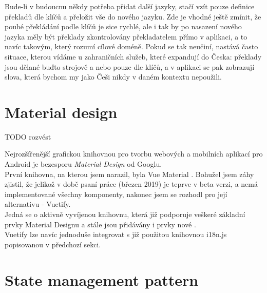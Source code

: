 Bude-li v budoucnu někdy potřeba přidat další jazyky, stačí vzít pouze definice překladů dle klíčů a přeložit vše do nového jazyku. Zde je vhodné ještě zmínit, že pouhé překládání podle klíčů je sice rychlé, ale i tak by po nasazení nového jazyka měly být překlady zkontrolovány překladatelem přímo v aplikaci, a to navíc takovým, který rozumí cílové doméně. Pokud se tak neučiní, nastává často situace, kterou vídáme u zahraničních služeb, které expandují do Česka: překlady jsou dělané buďto strojově a nebo pouze dle klíčů, a v aplikaci se pak zobrazují slova, která bychom my jako Češi nikdy v daném kontextu nepoužili.


\section{Material design}

TODO rozvést

Nejrozšířenější grafickou knihovnou pro tvorbu webových a mobilních aplikací pro Android je bezesporu \emph{Material Design} od Googlu.\\
První knihovna, na kterou jsem narazil, byla Vue Material \cite{vue-material}. Bohužel jsem záhy zjistil, že jelikož v době psaní práce (březen 2019) je teprve v beta verzi, a nemá implementované všechny komponenty, nakonec jsem se rozhodl pro její alternativu - Vuetify.\\
Jedná se o aktivně vyvíjenou knihovnu, která již podporuje veškeré základní prvky Material Designu a stále jsou přidávány i prvky nové \cite{vuetify}.\\
Vuetify lze navíc jednoduše integrovat s již použitou knihovnou i18n.js popisovanou v předchozí sekci.


\section{State management pattern}

